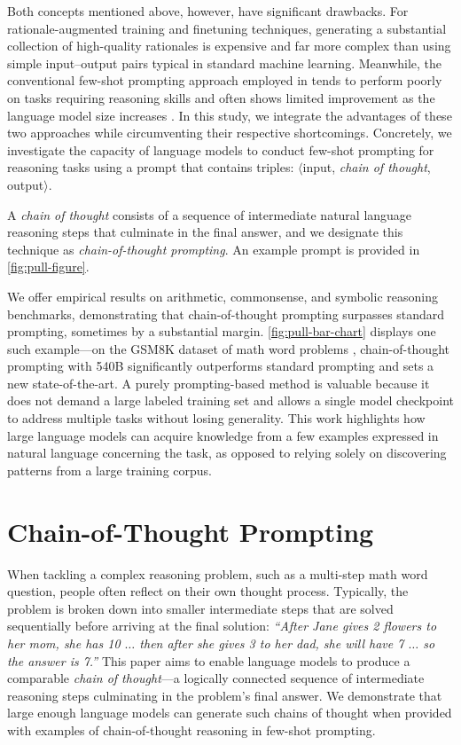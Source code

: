 Both concepts mentioned above, however, have significant drawbacks. For rationale-augmented training and finetuning techniques, generating a substantial collection of high-quality rationales is expensive and far more complex than using simple input--output pairs typical in standard machine learning. Meanwhile, the conventional few-shot prompting approach employed in \citet{brown2020language} tends to perform poorly on tasks requiring reasoning skills and often shows limited improvement as the language model size increases \citep{rae2021scaling}. In this study, we integrate the advantages of these two approaches while circumventing their respective shortcomings. Concretely, we investigate the capacity of language models to conduct few-shot prompting for reasoning tasks using a prompt that contains triples: $\langle$input, \emph{chain of thought}, output$\rangle$.

A \emph{chain of thought} consists of a sequence of intermediate natural language reasoning steps that culminate in the final answer, and we designate this technique as \textit{chain-of-thought prompting}. An example prompt is provided in \cref{fig:pull-figure}.

We offer empirical results on arithmetic, commonsense, and symbolic reasoning benchmarks, demonstrating that chain-of-thought prompting surpasses standard prompting, sometimes by a substantial margin. \cref{fig:pull-bar-chart} displays one such example—on the GSM8K dataset of math word problems \citep{cobbe2021training}, chain-of-thought prompting with \palm{} 540B significantly outperforms standard prompting and sets a new state-of-the-art. A purely prompting-based method is valuable because it does not demand a large labeled training set and allows a single model checkpoint to address multiple tasks without losing generality. This work highlights how large language models can acquire knowledge from a few examples expressed in natural language concerning the task, as opposed to relying solely on discovering patterns from a large training corpus.

\section{Chain-of-Thought Prompting} When tackling a complex reasoning problem, such as a multi-step math word question, people often reflect on their own thought process. Typically, the problem is broken down into smaller intermediate steps that are solved sequentially before arriving at the final solution: \textit{``After Jane gives 2 flowers to her mom, she has 10 $\ldots$ then after she gives 3 to her dad, she will have 7 $\ldots$ so the answer is 7.''} This paper aims to enable language models to produce a comparable \textit{chain of thought}—a logically connected sequence of intermediate reasoning steps culminating in the problem’s final answer. We demonstrate that large enough language models can generate such chains of thought when provided with examples of chain-of-thought reasoning in few-shot prompting.

